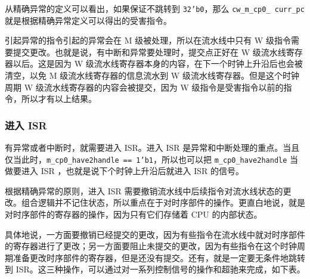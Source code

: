 \documentclass[12pt,AutoFakeBold,AutoFakeSlant]{article}
\newcommand{\ms}[1]{\texttt{#1}}
\begin{document}
从精确异常的定义可以看出，如果保证不跳转到 \ms{32'b0}，那么 \ms{cw\_m\_cp0\_\ curr\_pc} 就是根据精确异常定义可以得出的受害指令。

引起异常的指令引起的异常会在 M 级被处理，所以在流水线中只有 W 级指令需要提交更改。也就是说，有中断和异常要处理时，提交点正好在 W 级流水线寄存器以后。这是因为 W 级流水线寄存器本身的内容，在下一个时钟上升沿后也会被清空，以免 M 级流水线寄存器的信息流水到 W 级流水线寄存器。但是这个时钟周期 W 级流水线寄存器的内容会被提交，因为 W 级指令是受害指令以前的指令，所以才有以上结果。

\subsubsection{进入 ISR}

有异常或者中断时，就需要进入 ISR。进入 ISR 是异常和中断处理的重点。当且仅当此时，\ms{m\_cp0\_have2handle == 1'b1}，所以也可以把 \ms{m\_cp0\_have2handle} 当做要进入 ISR ，也就是说下个时钟上升沿后就进入 ISR 的信号。

根据精确异常的原则，进入 ISR 需要撤销流水线中后续指令对流水线状态的更改。组合逻辑并不记住状态，所以重点在于对时序部件的操作。更直白地说，就是对时序部件的寄存器的操作，因为只有它们存储着 CPU 的内部状态。

具体地说，一方面要撤销已经提交的更改，因为有些指令在流水线中就对时序部件的寄存器进行了更改；另一方面要阻止未提交的更改，因为有些指令在这个时钟周期准备更改时序部件的寄存器，但是还没有提交。还有，就是一定要无条件地跳转到 ISR。这三种操作，可以通过对一系列控制信号的操作和超驰来完成，如下表。
\end{document}
